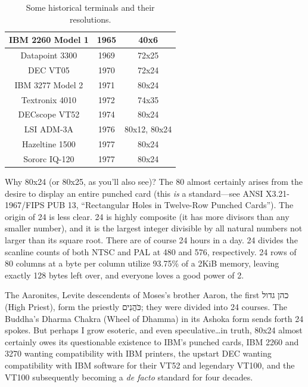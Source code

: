 \begin{table}[h]
\begin{center}
  \begin{tabular}{ |c|c|c| }
    \hline
    IBM 2260 Model 1 & 1965 & 40x6 \\
    \hline
    Datapoint 3300 & 1969 & 72x25 \\
    \hline
    DEC VT05 & 1970 & 72x24 \\
    \hline
    IBM 3277 Model 2 & 1971 & 80x24 \\
    \hline
    Textronix 4010 & 1972 & 74x35 \\
    \hline
    DECscope VT52 & 1974 & 80x24 \\
    \hline
    LSI ADM-3A & 1976 & 80x12, 80x24 \\
    \hline
    Hazeltine 1500 & 1977 & 80x24 \\
    \hline
    Sororc IQ-120 & 1977 & 80x24 \\
    \hline
  \end{tabular}
\caption{Some historical terminals and their resolutions.}
\end{center}
\end{table}

Why 80x24 (or 80x25, as you'll also see)\cite{infoworld80}? The 80 almost certainly arises from
the desire to display an entire punched card (this \textit{is} a standard---see
ANSI X3.21-1967/FIPS PUB 13, ``Rectangular Holes in Twelve-Row Punched
Cards'')\cite{sonicdelay}. The origin of 24 is less clear. 24 is highly
composite (it has more divisors than any smaller number), and it is the largest
integer divisible by all natural numbers not larger than its square root. There
are of course 24 hours in a day. 24 divides the scanline counts of both NTSC
and PAL at 480 and 576, respectively. 24 rows of 80 columns at a byte per
column utilize 93.75\% of a 2KiB memory, leaving exactly 128 bytes left over,
and everyone loves a good power of 2.

The Aaronites, Levite descendents of Moses's brother Aaron, the first
\texthebrew{כהן גדול}
(High Priest),
form the priestly \texthebrew{כֹּהֲנִים}; they were divided into 24 courses. The Buddha's Dharma Chakra (Wheel of Dhamma)
in its Ashoka form sends forth 24 spokes. But perhaps I grow esoteric, and even
speculative\ldots in truth, 80x24 almost certainly owes its questionable
existence to IBM's punched cards, IBM 2260 and 3270 wanting compatibility with
IBM printers, the upstart DEC wanting compatibility with IBM software for their
VT52 and legendary VT100, and the VT100 subsequently becoming a \textit{de facto} standard for
four decades.

